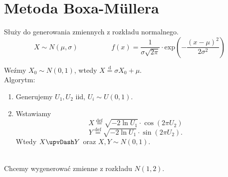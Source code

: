 \documentclass[12pt]{mwart}
\begin{document}
	
	\section{Metoda Boxa-Müllera}
	\noindent Służy do generowania zmiennych z rozkładu normalnego.
	$$X\sim N(\mu,\sigma) \hspace{2cm} f(x)=\dfrac{1}{\sigma\sqrt{2\pi}} \cdot \mathrm{exp}\left( -\dfrac{(x-\mu)^{2}}{2\sigma^{2}} \right)  $$
	
	\noindent Weźmy $X_{0}\sim N(0,1)$, wtedy $X \overset{\mathrm{d}}{=}\sigma X_{0} + \mu$. \\
	
	\noindent Algorytm:
	\begin{enumerate}
		\item Generujemy $U_{1}, U_{2}$ iid, $U_{i}\sim U(0,1)$.
		\item Wstawiamy
		$$X \overset{\mathrm{def}}{=} \sqrt{-2\ln{U_{1}}} \cdot \cos{\left( 2\pi U_{2} \right) }$$ 
		$$Y \overset{\mathrm{def}}{=} \sqrt{-2\ln{U_{1}}} \cdot \sin{\left( 2\pi U_{2} \right) }.$$
		Wtedy $X \upvDash Y$ oraz $X,Y \sim N(0,1)$. \\ \\
	\end{enumerate}
	
	\noindent Chcemy wygenerować zmienne z rozkładu $N(1,2)$.
	
	\begin{figure} [H]
		\centering 
	\end{figure}
	
\end{document}

